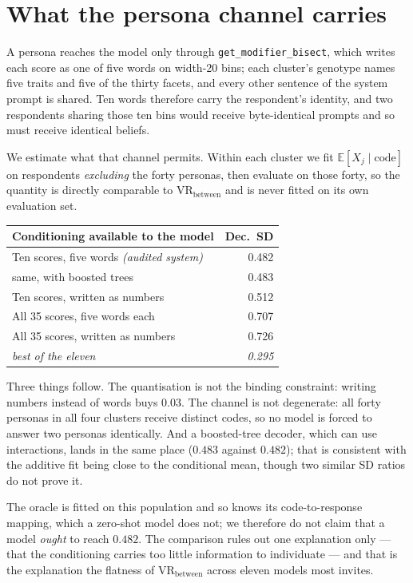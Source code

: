 \documentclass[11pt]{article}
\begin{document}
\section{What the persona channel carries}
\label{app:ceiling}

A persona reaches the model only through \texttt{get\_modifier\_bisect}, which
writes each score as one of five words on width-20 bins; each cluster's genotype
names five traits and five of the thirty facets, and every other sentence of the
system prompt is shared. Ten words therefore carry the respondent's identity, and
two respondents sharing those ten bins would receive byte-identical prompts and
so must receive identical beliefs.

We estimate what that channel permits. Within each cluster we fit
$\mathbb{E}[X_j \mid \text{code}]$ on respondents \emph{excluding} the forty
personas, then evaluate on those forty, so the quantity is directly comparable to
$\mathrm{VR}_\text{between}$ and is never fitted on its own evaluation set.

\begin{center}\footnotesize
\setlength{\tabcolsep}{3pt}
\begin{tabular}{@{}p{}r@{}}
\toprule
Conditioning available to the model & Dec.\ SD\\
\midrule
Ten scores, five words \emph{(audited system)} & 0.482\\
\quad same, with boosted trees & 0.483\\
Ten scores, written as numbers & 0.512\\
All 35 scores, five words each & 0.707\\
All 35 scores, written as numbers & 0.726\\
\midrule
\textit{best of the eleven} & \textit{0.295}\\
\bottomrule
\end{tabular}
\end{center}

Three things follow. The quantisation is not the binding constraint: writing
numbers instead of words buys $0.03$. The channel is not degenerate: all forty
personas in all four clusters receive distinct codes, so no model is forced to
answer two personas identically. And a boosted-tree decoder, which can use interactions, lands in the same place
($0.483$ against $0.482$); that is consistent with the additive fit being close
to the conditional mean, though two similar SD ratios do not prove it.

The oracle is fitted on this population and so knows its code-to-response
mapping, which a zero-shot model does not; we therefore do not claim that a model
\emph{ought} to reach $0.482$. The comparison rules out one explanation only ---
that the conditioning carries too little information to individuate --- and that is
the explanation the flatness of $\mathrm{VR}_\text{between}$ across eleven
models most invites.
\end{document}

